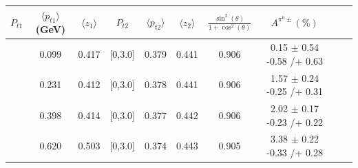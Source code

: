 \begin{table}[H]\scriptsize
\centering
\begin{tabular}{|c| c| c| c| c| c| c| c| c| c|}
\hline
$P_{t1}$   & $\langle  p_{t1} \rangle$(GeV) & $\langle  z_1 \rangle$& $P_{t2}$  & $\langle  p_{t2}\rangle$  &  $\langle  z_2 \rangle$  &$\frac{\sin^2(\theta)}{1+\cos^2(\theta)}$&  $A^{\pi^0\pm}(\%)$  \\ \hline
[0,0.15]	&	0.099	&	0.417	&	[0,3.0]	&	0.379	&	0.441	&	0.906	&	0.15	$\pm$ 	0.54	-0.58	/+	0.63	\\ \hline
[0.15,0.3]	&	0.231	&	0.412	&	[0,3.0]	&	0.378	&	0.441	&	0.906	&	1.57	$\pm$ 	0.24	-0.25	/+	0.31	\\ \hline
[0.3,0.5]	&	0.398	&	0.414	&	[0,3.0]	&	0.377	&	0.442	&	0.906	&	2.02	$\pm$ 	0.17	-0.23	/+	0.22	\\ \hline
[0.5,3.0]	&	0.620	&	0.503	&	[0,3.0]	&	0.374	&	0.443	&	0.905	&	3.38	$\pm$ 	0.22	-0.33	/+	0.28	\\ \hline
																				

\end{tabular}
\end{table}
